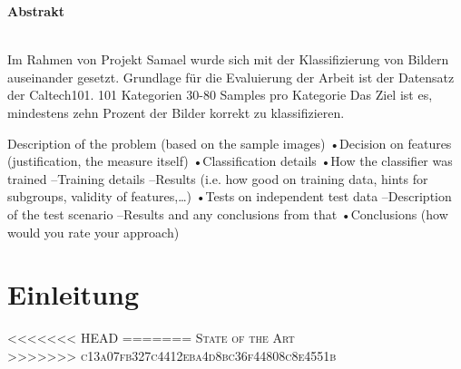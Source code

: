 \documentclass[liststotoc,11pt,a4paper]{article}
\begin{document}
\thispagestyle{empty}
\newpage
\setcounter{page}{1}
\tableofcontents                %
\newpage


\Large \bfseries Abstrakt\\
\normalsize \mdseries
{}
\\Im Rahmen von Projekt Samael wurde sich mit der Klassifizierung von Bildern auseinander gesetzt. Grundlage für die Evaluierung der Arbeit ist der Datensatz der Caltech101. 
101 Kategorien
30-80 Samples pro Kategorie
Das Ziel ist es, mindestens zehn Prozent der Bilder korrekt zu klassifizieren.


Description of the problem (based on the sample images)
•Decision on features (justification, the measure itself)
•Classification details
•How the classifier was trained
–Training details
–Results (i.e. how good on training data, hints for subgroups, validity of features,…)
•Tests on independent test data
–Description of the test scenario
–Results and any conclusions from that
•Conclusions (how would you rate your approach)
\section{Einleitung}
\label{firstSec}

<<<<<<< HEAD
=======
\scshape State of the Art\\ 
>>>>>>> c13a07fb327c4412eba4d8bc36f44808c8e4551b
\newline 
\normalfont

\newpage
{}	%
\setcounter{page}{6}
\renewcommand{\refname}{Referenzen}


\end{document}

